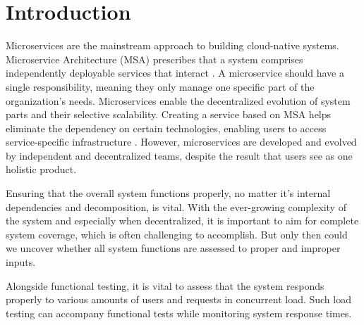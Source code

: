 
\section{Introduction} \label{sec:introduction}

Microservices are the mainstream approach to building cloud-native systems. Microservice Architecture (MSA) prescribes that a system comprises independently deployable services that interact
\cite{lewis2014microservices}. A microservice should have a single responsibility, meaning they only manage one specific part of the organization's needs. Microservices enable the decentralized evolution of system parts and their selective scalability.
Creating a service based on MSA helps eliminate the dependency on certain technologies, enabling users to access service-specific infrastructure \cite{cerny2018contextual}. However, microservices are developed and evolved by independent and decentralized teams, despite the result that users see as one holistic product.

Ensuring that the overall system functions properly, no matter it's internal dependencies and decomposition, is vital. With the ever-growing complexity of the system and especially when decentralized, it is important to aim for complete system coverage, which is often challenging to accomplish. But only then could we uncover whether all system functions are assessed to proper and improper inputs. 

Alongside functional testing, it is vital to assess that the system responds properly to various amounts of users and requests in concurrent load. Such load testing can accompany functional tests while monitoring system response times.


